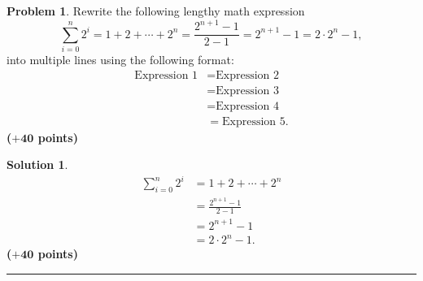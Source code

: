 \documentclass{article}
\theoremstyle{definition}
\newtheorem{problem}{Problem}
\def\fline{\rule{0.75\linewidth}{0.5pt}}
\newcommand{\finishline}{\begin{center}\fline\end{center}}
\newtheorem*{solution*}{Solution}
\newenvironment{solution}{\begin{solution*}}{{\finishline} \end{solution*}}
\newcommand{\grade}[1]{\hfill{\textbf{($\mathbf{#1}$ points)}}}
\begin{document}
\begin{problem}
	Rewrite the following lengthy math expression
	\[
		\sum_{i=0}^{n} 2^i = 1 + 2 + \cdots + 2^n = \frac{2^{n+1}-1}{2-1} = 2^{n+1}-1 = 2 \cdot 2^n - 1,
	\]
	into multiple lines using the following format:
	\begin{align*}
		\text{Expression 1} &= \text{Expression 2} \\
		&= \text{Expression 3} \\
		&= \text{Expression 4} \\
		&= \text{Expression 5}. 
	\end{align*}   \grade{+40} 
\end{problem}

\begin{solution} 

	\begin{align*}
		\sum_{i=0}^{n} 2^i &= 1 + 2 + \cdots + 2^n \\
		&= \frac{2^{n+1}-1}{2-1} \\
		&= 2^{n+1}-1 \\
		&= 2 \cdot 2^n - 1. 
	\end{align*}   \grade{+40} 
\end{solution}
\end{document}
